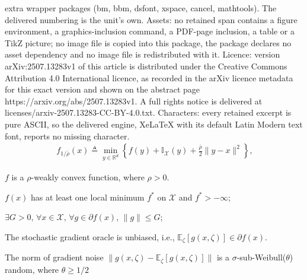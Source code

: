 \documentclass[10pt,a4paper]{amsart}
\def \E {\mathbb{E}}
\def \R {\mathbb{R}}
\def \X {\mathcal{X}}
\begin{document}
extra wrapper packages (bm, bbm, dsfont, xspace, cancel, mathtools). The delivered numbering is the unit's own. Assets: no retained span contains a figure environment, a graphics-inclusion command, a PDF-page inclusion, a table or a TikZ picture; no image file is copied into this package, the package declares no asset dependency and no image file is redistributed with it. Licence: version arXiv:2507.13283v1 of this article is distributed under the Creative Commons Attribution 4.0 International licence, as recorded in the arXiv licence metadata for this exact version and shown on the abstract page https://arxiv.org/abs/2507.13283v1. A full rights notice is delivered at licenses/arxiv-2507.13283-CC-BY-4.0.txt. Characters: every retained excerpt is pure ASCII, so the delivered engine, XeLaTeX with its default Latin Modern text font, reports no missing character.
 \begin{align}~\label{eq: fun_moreau_envelope}
     f_{1/\bar{\rho}}(x) \triangleq \min_{y\in\R^d}\left\{f(y)+\mathbb{I}_\X(y)+\frac{\bar{\rho}}{2}\|y-x\|^2\right\},
 \end{align}

 \begin{assumption}\label{assp:weak_conv}
     $f$ is a $\rho$-weakly convex function, where $\rho>0$.
 \end{assumption}

 \begin{assumption}\label{assp:lower_bound}
     $f(x)$ has at least one local minimum $f^*$ on $\mathcal{X}$ and $f^*> -\infty$;
 \end{assumption}

 \begin{assumption}\label{assp:G_Lipsch}
     $\exists G>0,\, \forall x\in\mathcal{X},\,\forall g\in\partial f(x),\, \|g\|\leq G$;
 \end{assumption}

 \begin{assumption}\label{assp:unbiased}
     The stochastic gradient oracle is unbiased, i.e., $\E_\zeta[g(x,\zeta)]\in\partial f(x)$.
 \end{assumption}

 \begin{assumption}\label{assp:sub_weibull}
      The norm of gradient noise $\|g(x,\zeta)-\E_\zeta[g(x,\zeta)]\|$ is a $\sigma$-sub-Weibull($\theta$) random, where $\theta\geq1/2$ 
 \end{assumption}
\end{document}
